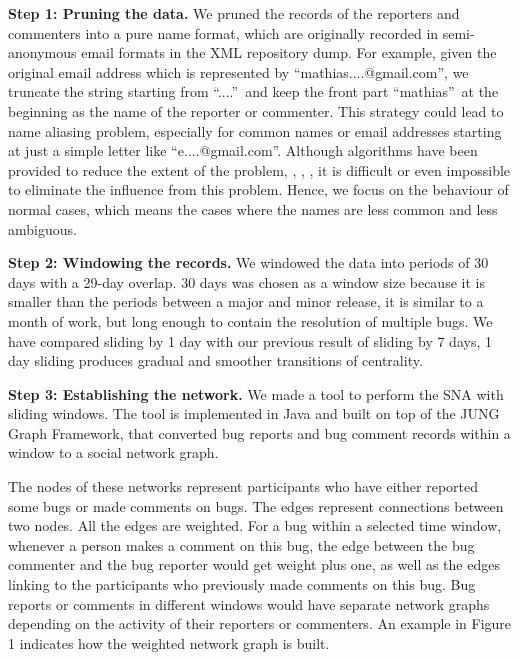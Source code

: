 \documentclass[conference]{IEEEtran}
\begin{document}
\textbf{Step 1: Pruning the data.} We pruned the records of the
reporters and commenters into a pure name format, which are originally
recorded in semi-anonymous email formats in the XML repository dump. 
For example, given the original email address which is represented by
\textquotedblleft mathias....@gmail.com\textquotedblright, we truncate
the string starting from \textquotedblleft ....\textquotedblright \
and keep the front part \textquotedblleft mathias\textquotedblright \
at the beginning as the name of the reporter or commenter. 
This strategy could lead to name aliasing problem, especially for
common names or email addresses starting at just a simple letter like
\textquotedblleft e....@gmail.com\textquotedblright.
 Although algorithms have been provided to reduce the extent of the problem, \cite{ACM:robles}, \cite{ACM:bird}, \cite{Elsevier:goeminne}, it is difficult or even impossible to eliminate the influence from
 this problem. Hence, we focus on the behaviour of normal cases, which
 means the cases where the names are less common and less ambiguous.


\textbf{Step 2: Windowing the records.} We windowed the data into
periods of 30 days with a 29-day overlap. 
30 days was chosen as a window size because it is smaller than the
periods between a major and minor release, it is similar to a month of
work, but long enough to contain the resolution of multiple bugs.
We have compared sliding by 1 day with our previous result of sliding by 7
days, 1 day sliding produces gradual and smoother transitions of
centrality.


\textbf{Step 3: Establishing the network.} We made a tool to perform the SNA with sliding
windows. The tool is implemented in Java and built on top of the JUNG Graph Framework, that converted bug
reports and bug comment records within a window to a social network graph.

The nodes of these networks represent participants who have either
reported some bugs or made comments on bugs. The edges represent
connections between two nodes. All the edges are weighted.  
For a bug within a selected time window, whenever a person
makes a comment on this bug, the edge between the bug commenter and
the bug reporter would get weight plus one, as well as the edges
linking to the participants who previously made comments on this
bug. Bug reports or comments in different windows would have separate
network graphs depending on the activity of their reporters or
commenters. An example in Figure 1 indicates how the weighted network
graph is built.
\end{document}

